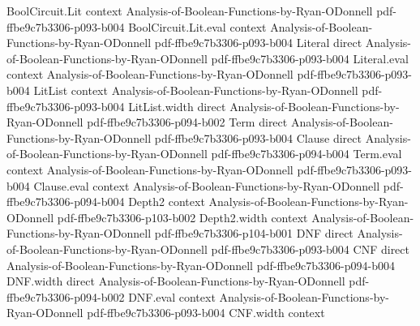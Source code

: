 \begin{lemma}
\leanok
{}
\proofstep
  {BoolCircuit.Lit}
  {context}
  {Analysis-of-Boolean-Functions-by-Ryan-ODonnell}
  {pdf-ffbe9c7b3306-p093-b004}
\proofstep
  {BoolCircuit.Lit.eval}
  {context}
  {Analysis-of-Boolean-Functions-by-Ryan-ODonnell}
  {pdf-ffbe9c7b3306-p093-b004}
\proofstep
  {Literal}
  {direct}
  {Analysis-of-Boolean-Functions-by-Ryan-ODonnell}
  {pdf-ffbe9c7b3306-p093-b004}
\proofstep
  {Literal.eval}
  {context}
  {Analysis-of-Boolean-Functions-by-Ryan-ODonnell}
  {pdf-ffbe9c7b3306-p093-b004}
\proofstep
  {LitList}
  {context}
  {Analysis-of-Boolean-Functions-by-Ryan-ODonnell}
  {pdf-ffbe9c7b3306-p093-b004}
\proofstep
  {LitList.width}
  {direct}
  {Analysis-of-Boolean-Functions-by-Ryan-ODonnell}
  {pdf-ffbe9c7b3306-p094-b002}
\proofstep
  {Term}
  {direct}
  {Analysis-of-Boolean-Functions-by-Ryan-ODonnell}
  {pdf-ffbe9c7b3306-p093-b004}
\proofstep
  {Clause}
  {direct}
  {Analysis-of-Boolean-Functions-by-Ryan-ODonnell}
  {pdf-ffbe9c7b3306-p094-b004}
\proofstep
  {Term.eval}
  {context}
  {Analysis-of-Boolean-Functions-by-Ryan-ODonnell}
  {pdf-ffbe9c7b3306-p093-b004}
\proofstep
  {Clause.eval}
  {context}
  {Analysis-of-Boolean-Functions-by-Ryan-ODonnell}
  {pdf-ffbe9c7b3306-p094-b004}
\proofstep
  {Depth2}
  {context}
  {Analysis-of-Boolean-Functions-by-Ryan-ODonnell}
  {pdf-ffbe9c7b3306-p103-b002}
\proofstep
  {Depth2.width}
  {context}
  {Analysis-of-Boolean-Functions-by-Ryan-ODonnell}
  {pdf-ffbe9c7b3306-p104-b001}
\proofstep
  {DNF}
  {direct}
  {Analysis-of-Boolean-Functions-by-Ryan-ODonnell}
  {pdf-ffbe9c7b3306-p093-b004}
\proofstep
  {CNF}
  {direct}
  {Analysis-of-Boolean-Functions-by-Ryan-ODonnell}
  {pdf-ffbe9c7b3306-p094-b004}
\proofstep
  {DNF.width}
  {direct}
  {Analysis-of-Boolean-Functions-by-Ryan-ODonnell}
  {pdf-ffbe9c7b3306-p094-b002}
\proofstep
  {DNF.eval}
  {context}
  {Analysis-of-Boolean-Functions-by-Ryan-ODonnell}
  {pdf-ffbe9c7b3306-p093-b004}
\proofstep
  {CNF.width}
  {context}

\end{lemma}
